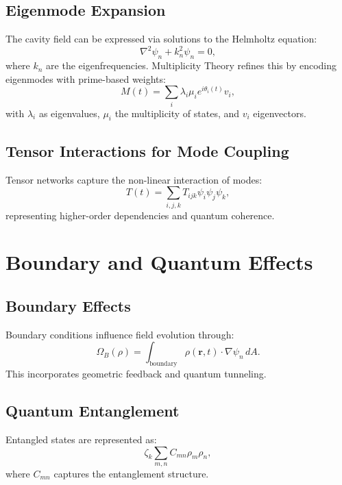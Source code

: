 \documentclass{article}
\theoremstyle{plain}
\begin{document}
\subsection{Eigenmode Expansion}
The cavity field can be expressed via solutions to the Helmholtz equation:
\begin{equation}
    \nabla^2 \psi_n + k_n^2 \psi_n = 0,
\end{equation}
where $k_n$ are the eigenfrequencies. Multiplicity Theory refines this by encoding eigenmodes with prime-based weights:
\begin{equation}
    M(t) = \sum_{i} \lambda_i \mu_i e^{i\theta_i(t)} v_i,
\end{equation}
with $\lambda_i$ as eigenvalues, $\mu_i$ the multiplicity of states, and $v_i$ eigenvectors.

\subsection{Tensor Interactions for Mode Coupling}
Tensor networks capture the non-linear interaction of modes:
\begin{equation}
    T(t) = \sum_{i,j,k} T_{ijk} \psi_i \psi_j \psi_k,
\end{equation}
representing higher-order dependencies and quantum coherence.

\section{Boundary and Quantum Effects}
\subsection{Boundary Effects}
Boundary conditions influence field evolution through:
\begin{equation}
    \Omega_B(\rho) = \int_{\text{boundary}} \rho(\bm{r}, t) \cdot \nabla \psi_n \, dA.
\end{equation}
This incorporates geometric feedback and quantum tunneling.

\subsection{Quantum Entanglement}
Entangled states are represented as:
\begin{equation}
    \zeta_k \sum_{m,n} C_{mn} \rho_m \rho_n,
\end{equation}
where $C_{mn}$ captures the entanglement structure.
\end{document}
